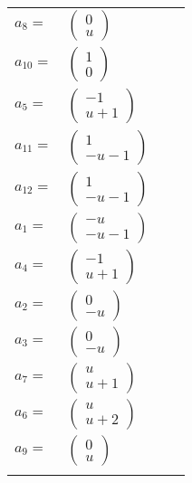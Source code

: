 \documentclass[1p]{elsarticle_modified}
\theoremstyle{definition}
\begin{document}
\begin{tabular}{m{7pt} m{180pt} m{7pt} m{180pt} }
\flushright $a_{8}=$&$\begin{pmatrix}0\\u\end{pmatrix}$ \\
\flushright $a_{10}=$&$\begin{pmatrix}1\\0\end{pmatrix}$ \\
\flushright $a_{5}=$&$\begin{pmatrix}-1\\u+1\end{pmatrix}$ \\
\flushright $a_{11}=$&$\begin{pmatrix}1\\- u-1\end{pmatrix}$ \\
\flushright $a_{12}=$&$\begin{pmatrix}1\\- u-1\end{pmatrix}$ \\
\flushright $a_{1}=$&$\begin{pmatrix}- u\\- u-1\end{pmatrix}$ \\
\flushright $a_{4}=$&$\begin{pmatrix}-1\\u+1\end{pmatrix}$ \\
\flushright $a_{2}=$&$\begin{pmatrix}0\\- u\end{pmatrix}$ \\
\flushright $a_{3}=$&$\begin{pmatrix}0\\- u\end{pmatrix}$ \\
\flushright $a_{7}=$&$\begin{pmatrix}u\\u+1\end{pmatrix}$ \\
\flushright $a_{6}=$&$\begin{pmatrix}u\\u+2\end{pmatrix}$ \\
\flushright $a_{9}=$&$\begin{pmatrix}0\\u\end{pmatrix}$\\&\end{tabular}
\end{document}
